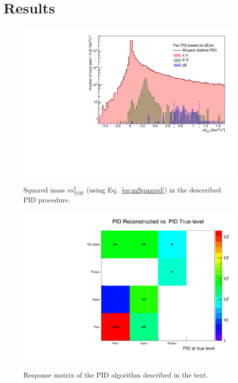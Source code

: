 \documentclass[a4paper,11pt]{article}
\begin{document}
\section{Results}\vspace{-10pt}
\begin{figure}[ht]
\begin{minipage}[b]{0.55\linewidth}
\centering
\includegraphics[width=\linewidth]{graphics/sqMassFromTof.pdf}\label{fig:mSquared}\caption{Squared mass $m^{2}_{\text{TOF}}$ (using Eq.~\ref{eq:mSquared}) in the desceribed PID procedure.}
\end{minipage}
\hspace{0.1cm}
\begin{minipage}[b]{0.44\linewidth}
\centering
\includegraphics[width=\linewidth]{graphics/PidEfficiency.pdf}\label{fig:PID}\caption{Response matrix of the PID algorithm described in the text.}
\end{minipage}
\end{figure}
\end{document}
